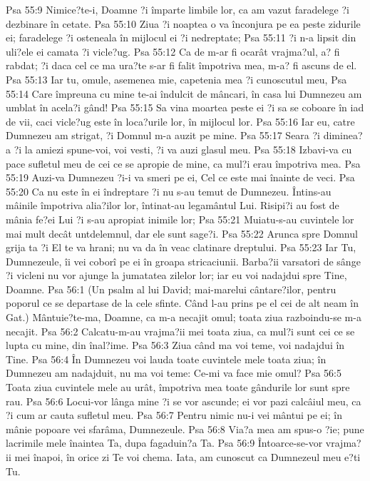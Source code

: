 Psa 55:9  Nimice?te-i, Doamne ?i împarte limbile lor, ca am vazut faradelege ?i dezbinare în cetate.
Psa 55:10  Ziua ?i noaptea o va înconjura pe ea peste zidurile ei; faradelege ?i osteneala în mijlocul ei ?i nedreptate;
Psa 55:11  ?i n-a lipsit din uli?ele ei camata ?i vicle?ug.
Psa 55:12  Ca de m-ar fi ocarât vrajma?ul, a? fi rabdat; ?i daca cel ce ma ura?te s-ar fi falit împotriva mea, m-a? fi ascuns de el.
Psa 55:13  Iar tu, omule, asemenea mie, capetenia mea ?i cunoscutul meu,
Psa 55:14  Care împreuna cu mine te-ai îndulcit de mâncari, în casa lui Dumnezeu am umblat în acela?i gând!
Psa 55:15  Sa vina moartea peste ei ?i sa se coboare în iad de vii, caci vicle?ug este în loca?urile lor, în mijlocul lor.
Psa 55:16  Iar eu, catre Dumnezeu am strigat, ?i Domnul m-a auzit pe mine.
Psa 55:17  Seara ?i diminea?a ?i la amiezi spune-voi, voi vesti, ?i va auzi glasul meu.
Psa 55:18  Izbavi-va cu pace sufletul meu de cei ce se apropie de mine, ca mul?i erau împotriva mea.
Psa 55:19  Auzi-va Dumnezeu ?i-i va smeri pe ei, Cel ce este mai înainte de veci.
Psa 55:20  Ca nu este în ei îndreptare ?i nu s-au temut de Dumnezeu. Întins-au mâinile împotriva alia?ilor lor, întinat-au legamântul Lui. Risipi?i au fost de mânia fe?ei Lui ?i s-au apropiat inimile lor;
Psa 55:21  Muiatu-s-au cuvintele lor mai mult decât untdelemnul, dar ele sunt sage?i.
Psa 55:22  Arunca spre Domnul grija ta ?i El te va hrani; nu va da în veac clatinare dreptului.
Psa 55:23  Iar Tu, Dumnezeule, îi vei coborî pe ei în groapa stricaciunii. Barba?ii varsatori de sânge ?i vicleni nu vor ajunge la jumatatea zilelor lor; iar eu voi nadajdui spre Tine, Doamne.
Psa 56:1  (Un psalm al lui David; mai-marelui cântare?ilor, pentru poporul ce se departase de la cele sfinte. Când l-au prins pe el cei de alt neam în Gat.) Mântuie?te-ma, Doamne, ca m-a necajit omul; toata ziua razboindu-se m-a necajit.
Psa 56:2  Calcatu-m-au vrajma?ii mei toata ziua, ca mul?i sunt cei ce se lupta cu mine, din înal?ime.
Psa 56:3  Ziua când ma voi teme, voi nadajdui în Tine.
Psa 56:4  În Dumnezeu voi lauda toate cuvintele mele toata ziua; în Dumnezeu am nadajduit, nu ma voi teme: Ce-mi va face mie omul?
Psa 56:5  Toata ziua cuvintele mele au urât, împotriva mea toate gândurile lor sunt spre rau.
Psa 56:6  Locui-vor lânga mine ?i se vor ascunde; ei vor pazi calcâiul meu, ca ?i cum ar cauta sufletul meu.
Psa 56:7  Pentru nimic nu-i vei mântui pe ei; în mânie popoare vei sfarâma, Dumnezeule.
Psa 56:8  Via?a mea am spus-o ?ie; pune lacrimile mele înaintea Ta, dupa fagaduin?a Ta.
Psa 56:9  Întoarce-se-vor vrajma?ii mei înapoi, în orice zi Te voi chema. Iata, am cunoscut ca Dumnezeul meu e?ti Tu.
